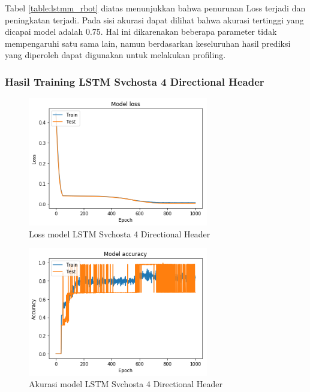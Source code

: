 \documentclass[./skripsi.tex]{subfiles}
\begin{document}
\par Tabel \ref{table:lstmm_rbot} diatas menunjukkan bahwa penurunan Loss terjadi dan peningkatan terjadi. Pada sisi akurasi dapat dilihat bahwa akurasi tertinggi yang dicapai model adalah 0.75. Hal ini dikarenakan beberapa parameter tidak mempengaruhi satu sama lain, namun berdasarkan keseluruhan hasil prediksi yang diperoleh dapat digunakan untuk melakukan profiling.

\subsubsection{Hasil Training LSTM Svchosta 4 Directional Header}

\begin{figure}%
    \centering
    \includegraphics[width=0.7\textwidth]{public/assets/img/lstm4_svchosta_loss.png}
    \caption{Loss model LSTM Svchosta 4 Directional Header}
    \label{fig:lstm4_svchosta_loss}
\end{figure}
\begin{figure}%
    \centering
    \includegraphics[width=0.7\textwidth]{public/assets/img/lstm4_svchosta_acc.png}
    \caption{Akurasi model LSTM Svchosta 4 Directional Header}
    \label{fig:lstm4_svchosta_acc}
\end{figure}
\end{document}
